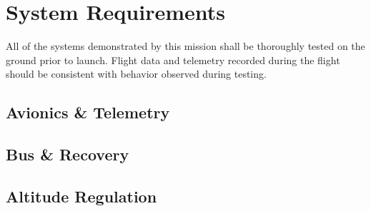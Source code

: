 
\section{System Requirements}
All of the systems demonstrated by this mission shall be thoroughly tested on
the ground prior to launch. Flight data and telemetry recorded during the flight
should be consistent with behavior observed during testing.

\subsection{Avionics \& Telemetry}

\subsection{Bus \& Recovery}

\subsection{Altitude Regulation}